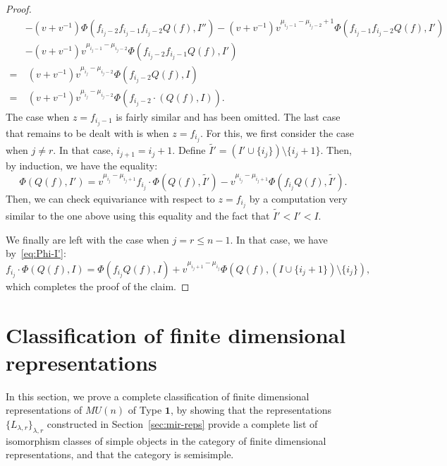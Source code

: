\documentclass{amsart}
\numberwithin{equation}{section}
\theoremstyle{theorem}
\newtheorem{theorem}{Theorem}[section]
\theoremstyle{definition}
\newcommand{\sm}{\setminus}
\newcommand{\sll}{\mathfrak{sl}}
\newcommand{\uvsln}{U_v(\sll_n)}
\begin{document}
\begin{proof}
\begin{align*}
&-(v+v^{-1})\Phi(f_{i_j-2}f_{i_j-1}f_{i_j-2}Q(f),I'')-(v+v^{-1})v^{\mu_{i_j-1}-\mu_{i_j-2}+1}\Phi(f_{i_j-1}f_{i_j-2}Q(f),I')\\
&-(v+v^{-1})v^{\mu_{i_j-1}-\mu_{i_j-2}}\Phi(f_{i_j-2}f_{i_j-1}Q(f),I')\\
=&~(v+v^{-1})v^{\mu_{i_j}-\mu_{i_j-2}} \Phi(f_{i_j-2}Q(f), I)\\
=&~(v+v^{-1})v^{\mu_{i_j}-\mu_{i_j-2}} \Phi(f_{i_j-2}\cdot(Q(f), I)).
\end{align*}
The case when $z=f_{i_j-1}$ is fairly similar and has been omitted. The last case that remains to be dealt with is when $z=f_{i_j}$. For this, we first consider the case when $j\neq r$. In that case, $i_{j+1}=i_j+1$. Define $\widetilde{I'} = (I'\cup\{i_j\})\sm\{i_j+1\}$. Then, by induction, we have the equality:
\[\Phi(Q(f),I')=v^{\mu_{i_j}-\mu_{i_j+1}}f_{i_j}\cdot \Phi(Q(f),\widetilde{I'})-v^{\mu_{i_j}-\mu_{i_j+1}}\Phi(f_{i_j}Q(f),\widetilde{I'}).\]
Then, we can check equivariance with respect to $z=f_{i_j}$ by a computation very similar to the one above using this equality and the fact that $\widetilde{I'}<I'<I$.

We finally are left with the case when $j=r\leq n-1$. In that case, we have by~\eqref{eq:Phi-I'}:
\[f_{i_j}\cdot \Phi(Q(f),I) = \Phi(f_{i_j}Q(f),I) + v^{\mu_{i_j+1}-\mu_{i_j}}\Phi(Q(f),(I\cup\{i_j+1\})\sm\{i_j\}),\]
which completes the proof of the claim.
\end{proof}

\section{Classification of finite dimensional representations}\label{sec:ss}

In this section, we prove a complete classification of finite dimensional representations of $MU(n)$ of Type $\mathbf{1}$, by showing %
that the %
representations $\{L_{\lambda,r}\}_{\lambda,r}$ constructed in Section~\ref{sec:mir-reps} provide a complete list of isomorphism classes of simple objects in the category of finite dimensional representations, and that the category is semisimple.

\end{document}
